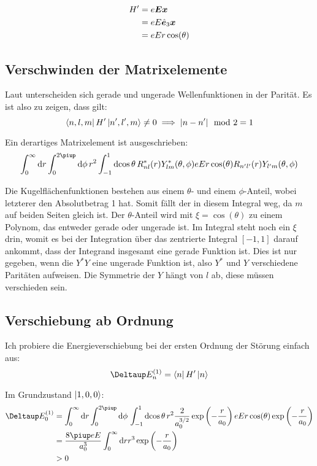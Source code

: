 \begin{align*}
	H'
	&= e \boldsymbol{E} \boldsymbol{x} \\
	&= e E \hat{\boldsymbol{e}}_3 \boldsymbol{x} \\
	&= e E r \cos(\theta)
\end{align*}

\subsection{Verschwinden der Matrixelemente}

Laut \cite{wikipedia/Parität} unterscheiden sich gerade und ungerade
Wellenfunktionen in der Parität. Es ist also zu zeigen, dass gilt:
\[
	\bra{n, l, m} H' \ket{n', l', m} \neq 0
	\implies
	|n - n'| \mod 2 = 1
\]

Ein derartiges Matrixelement ist ausgeschrieben:
\[
	\int_0^\infty \dif r \int_0^{2\piup} \dif \phi \, r^2 \int_{-1}^1 \dif{\cos\theta} \, R_{nl}^*(r) Y_{lm}^*(\theta, \phi) e E r \cos(\theta) R_{n'l'}(r) Y_{l'm}(\theta, \phi)
\]

Die Kugelflächenfunktionen bestehen aus einem $\theta$- und einem
$\phi$-Anteil, wobei letzterer den Absolutbetrag 1 hat. Somit fällt der in
diesem Integral weg, da $m$ auf beiden Seiten gleich ist. Der $\theta$-Anteil
wird mit $\xi = \cos(\theta)$ zu einem Polynom, das entweder gerade oder
ungerade ist. Im Integral steht noch ein $\xi$ drin, womit es bei der
Integration über das zentrierte Integral $[-1, 1]$ darauf ankommt, dass der
Integrand insgesamt eine gerade Funktion ist. Dies ist nur gegeben, wenn die
$Y^*Y$ eine ungerade Funktion ist, also $Y^*$ und $Y$ verschiedene Paritäten
aufweisen. Die Symmetrie der $Y$ hängt von $l$ ab, diese müssen verschieden
sein.

\subsection{Verschiebung ab Ordnung}

Ich probiere die Energieverschiebung bei der ersten Ordnung der Störung einfach aus:
\[
	\Deltaup E_n^{(1)} = \bra n H' \ket n
\]

Im Grundzustand $\ket{1, 0, 0}$:
\begin{align*}
	\Deltaup E_0^{(1)}
	&= \int_0^\infty \dif r \int_0^{2\piup} \dif \phi \, \int_{-1}^1 \dif{\cos\theta} \, 
	r^2 \frac{2}{a_0^{3/2}} \exp\del{-\frac r{a_0}} e E r \cos(\theta) \exp\del{-\frac r{a_0}} \\
	&= \frac{8 \piup eE}{a_0^3} \int_0^\infty \dif r r^3 \exp\del{-\frac r{a_0}} \\
	&> 0
\end{align*}

